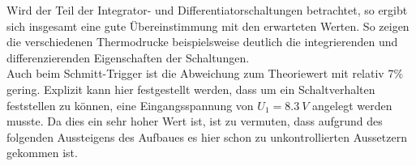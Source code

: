 Wird der Teil der Integrator- und Differentiatorschaltungen betrachtet, so ergibt sich insgesamt eine gute Übereinstimmung mit den erwarteten Werten. So zeigen die verschiedenen Thermodrucke beispielsweise deutlich die integrierenden und differenzierenden Eigenschaften der Schaltungen.\\
Auch beim Schmitt-Trigger ist die Abweichung zum Theoriewert mit relativ 7$\%$ gering. Explizit kann hier festgestellt werden, dass um ein Schaltverhalten feststellen zu können, eine Eingangsspannung von $U_1=\SI{8,3}{V}$ angelegt werden musste. Da dies ein sehr hoher Wert ist, ist zu vermuten, dass aufgrund des folgenden Aussteigens des Aufbaues es hier schon zu unkontrollierten Aussetzern gekommen ist.
